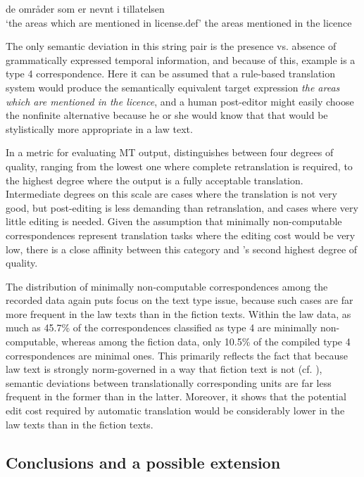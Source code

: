 \documentclass[output=paper]{LSP/langsci}
\begin{document}
\ea \label{ex:thunes:6}
\ea
de områder som er nevnt i tillatelsen   \\
`the areas which are mentioned in license.def' 
\ex
the areas mentioned in the licence
\z
\z

The only semantic deviation in this string pair is the presence vs. absence of grammatically expressed temporal information, and because of this, example  is a type 4 correspondence. Here it can be assumed that a rule-based translation system would produce the semantically equivalent target expression \textit{the areas which are mentioned in the licence}, and a human post-editor might easily choose the nonfinite alternative because he or she would know that that would be stylistically more appropriate in a law text.

In a metric for evaluating MT output, \citet[75]{Specia2011} distinguishes between four degrees of quality, ranging from the lowest one where complete retranslation is required, to the highest degree where the output is a fully acceptable translation. Intermediate degrees on this scale are cases where the translation is not very good, but post-editing is less demanding than retranslation, and cases where very little editing is needed. Given the assumption that minimally non-computable correspondences represent translation tasks where the editing cost would be very low, there is a close affinity between this category and \citeauthor{Specia2011}'s second highest degree of quality.

The distribution of minimally non-computable correspondences among the recorded data again puts focus on the text type issue, because such cases are far more frequent in the law texts than in the fiction texts. Within the law data, as much as 45.7\% of the correspondences classified as type 4 are minimally non-computable, whereas among the fiction data, only 10.5\% of the compiled type 4 correspondences are minimal ones. This primarily reflects the fact that because law text is strongly norm-governed in a way that fiction text is not (cf. ), semantic deviations between translationally corresponding units are far less frequent in the former than in the latter. Moreover, it shows that the potential edit cost required by automatic translation would be considerably lower in the law texts than in the fiction texts.

\subsection{Conclusions and a possible extension}\label{sec:thunes:5.3}
\end{document}
